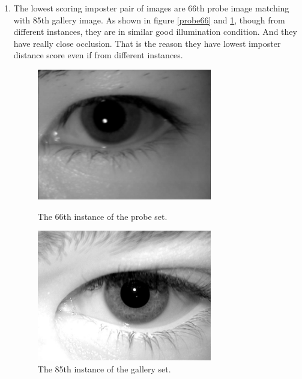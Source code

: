 \documentclass[a4paper]{article}
\begin{document}
\begin{spacing}{2.0}
\begin{enumerate}
	\item The lowest scoring imposter pair of images are 66th probe image matching with 85th gallery image. As shown in figure \ref{probe66} and \ref{gallery85}, though from different instances, they are in similar good illumination condition. And they have really close occlusion. That is the reason they have lowest imposter distance score even if from different instances. 
	\begin{figure}[H]
	\begin{minipage}[t]{0.5\linewidth}
	\centering
	\includegraphics[width = 3in]{probe66filtered.jpg}
	\caption{The 66th instance of the probe set.}
	\label{probe66}
	\end{minipage}
	\begin{minipage}[t]{0.5\linewidth}
	\centering
	\includegraphics[width = 3in]{gallery85filtered.jpg}
	\caption{The 85th instance of the gallery set.}
	\label{gallery85}
	\end{minipage}
	\end{figure}


\end{enumerate}
\end{spacing}
\end{document}
